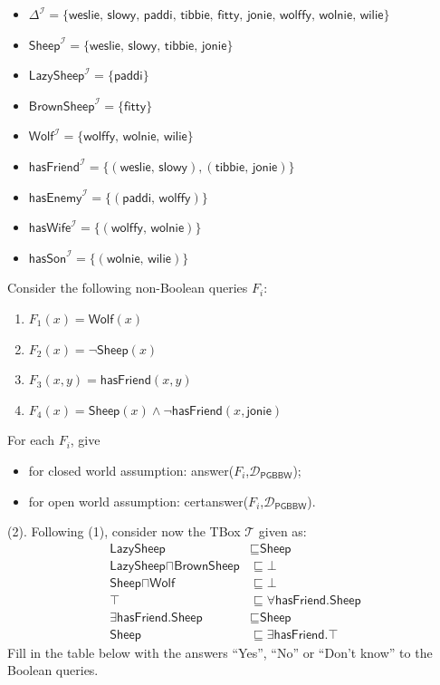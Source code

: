 \documentclass[12pt,a4paper]{article}
\newenvironment{problem}[2][{\color{red}Question}]{\begin{trivlist}
\item[\hskip \labelsep {\bfseries #1}\hskip \labelsep {\bfseries #2.}]}{\end{trivlist}}
\begin{document}
\begin{problem}{{\color{red}1}}
\begin{itemize}
    \item[] $\Delta^{\mathcal{I}}=\{\textsf{weslie, slowy, paddi, tibbie, fitty, jonie, wolffy, wolnie, wilie}\}$
    \item[] $\textsf{Sheep}^{\mathcal{I}}=\{\textsf{weslie, slowy, tibbie, jonie}\}$
    \item[] $\textsf{LazySheep}^{\mathcal{I}}=\{\textsf{paddi}\}$
    \item[] $\textsf{BrownSheep}^{\mathcal{I}}=\{\textsf{fitty}\}$
    \item[] $\textsf{Wolf}^{\mathcal{I}}=\{\textsf{wolffy, wolnie, wilie}\}$
    \item[] $\textsf{hasFriend}^{\mathcal{I}}=\{(\textsf{weslie, slowy}),(\textsf{tibbie, jonie})\}$
    \item[] $\textsf{hasEnemy}^{\mathcal{I}}=\{(\textsf{paddi, wolffy})\}$
    \item[] $\textsf{hasWife}^{\mathcal{I}}=\{(\textsf{wolffy, wolnie})\}$
    \item[] $\textsf{hasSon}^{\mathcal{I}}=\{(\textsf{wolnie, wilie})\}$
\end{itemize}


Consider the following non-Boolean queries $F_{i}$:

\begin{enumerate}
    \item $F_{1}(x)=\textsf{Wolf}(x)$ 
    \item $F_{2}(x)=\neg\textsf{Sheep}(x)$ 
    \item $F_{3}(x,y)=\textsf{hasFriend}(x,y)$ 
    \item $F_{4}(x)=\textsf{Sheep}(x)\wedge\neg\textsf{hasFriend}(x,\textsf{jonie})$
\end{enumerate}

For each $F_{i}$, give

\begin{itemize}
    \item[-] for closed world assumption: \textsf{answer($F_{i}$,$\mathcal{D}_{\textsf{PGBBW}}$)};
    \item[-] for open world assumption: \textsf{certanswer($F_{i}$,$\mathcal{D}_{\textsf{PGBBW}}$)}. 
\end{itemize}


(2). Following (1), consider now the TBox $\mathcal{T}$ given as:
\begin{align*}
    \textsf{LazySheep} & \sqsubseteq \textsf{Sheep}\\
    \textsf{LazySheep}\sqcap\textsf{BrownSheep} & \sqsubseteq\bot\\
    \textsf{Sheep}\sqcap\textsf{Wolf} & \sqsubseteq\bot\\
    \top & \sqsubseteq\forall\textsf{hasFriend.Sheep}\\
    \exists\textsf{hasFriend.Sheep} & \sqsubseteq\textsf{Sheep}\\
    \textsf{Sheep} & \sqsubseteq\exists\textsf{hasFriend.}\top
\end{align*}
Fill in the table below with the answers ``Yes'', ``No'' or ``Don't know'' to the Boolean queries.


\end{problem}
\end{document}
